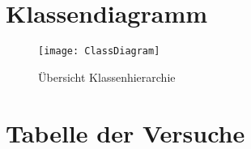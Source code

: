 
\section{Klassendiagramm}

\begin{figure}[!htbp]
	\centering
	\texttt{[image: ClassDiagram]}
	\caption[Übersicht Klassenhierarchie]{Übersicht Klassenhierarchie}
	\label{fig:ClassDiagram}
\end{figure}

\section{Tabelle der Versuche}

